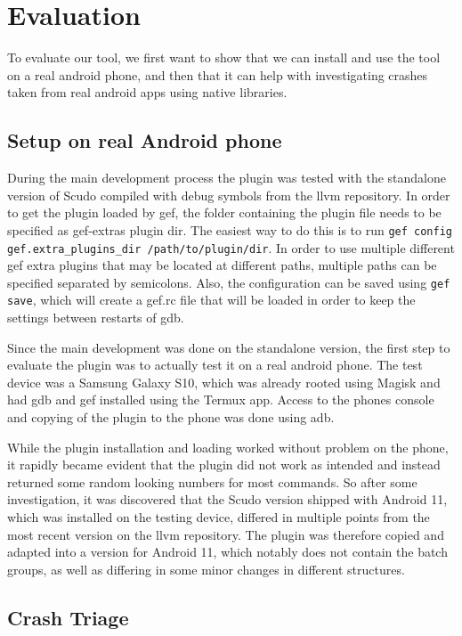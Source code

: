 \documentclass[a4paper,11pt,oneside]{report}
\begin{document}
\chapter{Evaluation}

To evaluate our tool, we first want to show that we can install and use the
tool on a real android phone, and then that it can help with investigating
crashes taken from real android apps using native libraries.

\section{Setup on real Android phone}

During the main development process the plugin was tested with the standalone
version of Scudo compiled with debug symbols from the llvm repository. In
order to get the plugin loaded by gef, the folder containing the plugin file
needs to be specified as gef-extras plugin dir. The easiest way to do this
is to run \verb|gef config gef.extra_plugins_dir /path/to/plugin/dir|. In order
to use multiple different gef extra plugins that may be located at different
paths, multiple paths can be specified separated by semicolons. Also, the
configuration can be saved using \verb|gef save|, which will create a gef.rc file
that will be loaded in order to keep the settings between restarts of gdb.

Since the main development was done on the standalone version, the first step
to evaluate the plugin was to actually test it on a real android phone. The
test device was a Samsung Galaxy S10, which was already rooted using Magisk
and had gdb and gef installed using the Termux app. Access to the phones
console and copying of the plugin to the phone was done using adb.

While the plugin installation and loading worked without problem on the phone, it
rapidly became evident that the plugin did not work as intended and instead
returned some random looking numbers for most commands. So after some
investigation, it was discovered that the Scudo version shipped with Android
11, which was installed on the testing device, differed in multiple points
from the most recent version on the llvm repository. The plugin was therefore
copied and adapted into a version for Android 11, which notably does not
contain the batch groups, as well as differing in some minor changes in
different structures.

\section{Crash Triage}
\end{document}
